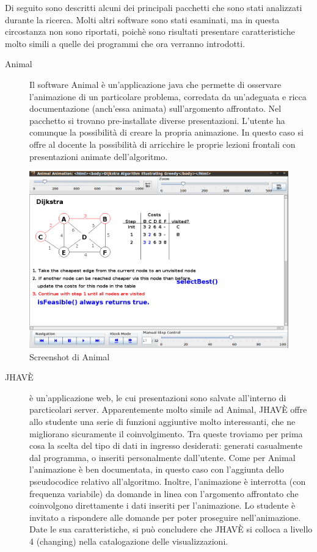 Di seguito sono descritti alcuni dei principali pacchetti che sono
stati analizzati durante la ricerca. Molti altri software sono stati
esaminati, ma in questa circostanza non sono riportati, poichè sono
risultati presentare caratteristiche molto simili a quelle dei programmi
che ora verranno introdotti. 
\begin{description}
\item [{{Animal}}] Il software Animal \cite{Animal} è un'applicazione
java che permette di osservare l'animazione di un particolare problema,
corredata da un'adeguata e ricca documentazione (anch'essa animata)
sull'argomento affrontato. Nel pacchetto si trovano pre-installate
diverse presentazioni. L'utente ha comunque la possibilità di creare
la propria animazione. In questo caso si offre al docente la possibilità
di arricchire le proprie lezioni frontali con presentazioni animate
dell'algoritmo.
\end{description}
\begin{figure}[htbp]
\centering
\includegraphics[scale=0.25]{images/Animal_screenshot.png}
\caption{Screenshot di Animal}
\end {figure}
\begin{description}
\item [{{JHAVÈ}}] è un'applicazione web, le cui presentazioni sono salvate
all'interno di parcticolari server. Apparentemente molto simile ad
Animal, JHAVÈ offre allo studente una serie di funzioni aggiuntive
molto interessanti, che ne migliorano sicuramente il coinvolgimento.
Tra queste troviamo per prima cosa la scelta del tipo di dati in ingresso
desiderati: generati casualmente dal programma, o inseriti personalmente
dall'utente. Come per Animal l'animazione è ben documentata, in questo
caso con l'aggiunta dello pseudocodice relativo all'algoritmo. Inoltre,
l'animazione è interrotta (con frequenza variabile) da domande in
linea con l'argomento affrontato che coinvolgono direttamente i dati
inseriti per l'animazione. Lo studente è invitato a rispondere alle
domande per poter proseguire nell'animazione. Date le sua caratteristiche,
si può concludere che JHAVÈ si colloca a livello 4 (changing) nella
catalogazione delle visualizzazioni.
\end{description}
